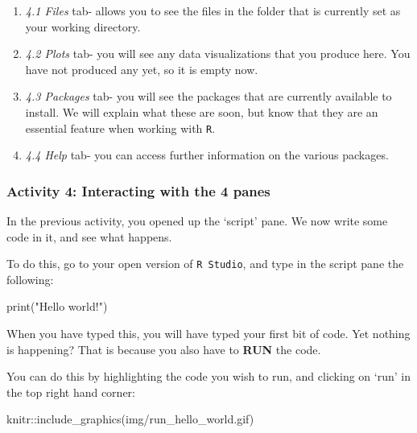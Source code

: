 \documentclass[
]{book}
\newenvironment{Shaded}{\begin{snugshade}}{\end{snugshade}}
\newcommand{\FunctionTok}[1]{\textcolor[rgb]{0.00,0.00,0.00}{#1}}
\newcommand{\NormalTok}[1]{#1}
\newcommand{\SpecialCharTok}[1]{\textcolor[rgb]{0.00,0.00,0.00}{#1}}
\newcommand{\StringTok}[1]{\textcolor[rgb]{0.31,0.60,0.02}{#1}}
\begin{document}
\begin{enumerate}
\def\labelenumi{\roman{enumi})}
\item
  \emph{4.1 Files} tab- allows you to see the files in the folder that is currently set as your working directory.
\item
  \emph{4.2 Plots} tab- you will see any data visualizations that you produce here. You have not produced any yet, so it is empty now.
\item
  \emph{4.3 Packages} tab- you will see the packages that are currently available to install. We will explain what these are soon, but know that they are an essential feature when working with \texttt{R}.
\item
  \emph{4.4 Help} tab- you can access further information on the various packages.
\end{enumerate}

\hypertarget{activity-4-interacting-with-the-4-panes}{%
\subsubsection{Activity 4: Interacting with the 4 panes}\label{activity-4-interacting-with-the-4-panes}}

In the previous activity, you opened up the `script' pane. We now write some code in it, and see what happens.

To do this, go to your open version of \texttt{R\ Studio}, and type in the script pane the following:

\begin{Shaded}
\begin{Highlighting}[]
\FunctionTok{print}\NormalTok{(}\StringTok{"Hello world!"}\NormalTok{)}
\end{Highlighting}
\end{Shaded}

When you have typed this, you will have typed your first bit of code. Yet nothing is happening? That is because you also have to \textbf{RUN} the code.

You can do this by highlighting the code you wish to run, and clicking on `run' in the top right hand corner:

\begin{Shaded}
\begin{Highlighting}[]
\NormalTok{knitr}\SpecialCharTok{::}\FunctionTok{include\_graphics}\NormalTok{(}\StringTok{\textquotesingle{}img/run\_hello\_world.gif\textquotesingle{}}\NormalTok{)}
\end{Highlighting}
\end{Shaded}
\end{document}
